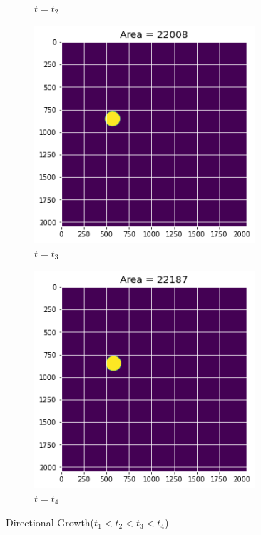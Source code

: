 \documentclass[12pt, a4paper]{report}
\begin{document}
\begin{figure}[H]
\begin{subfigure}{.45\textwidth}
  \caption{$t = t_2$}
  \label{img:microstrImg}
\end{subfigure}
\begin{subfigure}{.45\textwidth}
  \centering
  \includegraphics[width=0.9\textwidth]{Pictures/Growth/1.3.jpeg}
  \caption{$t = t_3$}
  \label{img:microstrImg}
\end{subfigure}
\begin{subfigure}{.45\textwidth}
  \centering
  \includegraphics[width=0.9\textwidth]{Pictures/Growth/1.4.jpeg}
  \caption{$t = t_4$}
  \label{img:microstrImg}
\end{subfigure}

\caption{Directional Growth($t_1<t_2<t_3<t_4$)}
\label{fig:dirGrowImg}
\end{figure}
\end{document}
